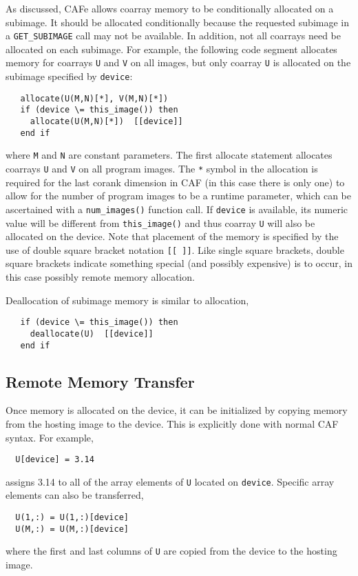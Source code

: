 As discussed, CAFe allows coarray memory to be conditionally allocated on a subimage.
It should be allocated conditionally because the requested subimage in a \texttt{GET\_SUBIMAGE}
call may not be available.  In addition, not all coarrays need be allocated on each
subimage.  For example, the following code segment allocates memory for coarrays
\texttt{U} and \texttt{V} on all images, but only coarray \texttt{U} is allocated on
the subimage specified by \texttt{device}:
\small
\begin{verbatim}
   allocate(U(M,N)[*], V(M,N)[*])
   if (device \= this_image()) then
     allocate(U(M,N)[*])  [[device]]
   end if
\end{verbatim}
\normalsize
where \texttt{M} and \texttt{N} are constant parameters.  The first allocate statement
allocates coarrays \texttt{U} and \texttt{V} on all program images.  The \texttt{*} symbol
in the allocation is required for the last corank dimension in CAF (in this case there is
only one) to allow for the number of program images to be a runtime parameter, which can
be ascertained with a \texttt{num\_images()} function call.  If \texttt{device} is
available, its numeric value will be different from \texttt{this\_image()} and thus
coarray \texttt{U} will also be allocated on the device.  Note that placement of the
memory is specified by the use of double square bracket notation \texttt{[[ ]]}.  Like
single square brackets, double square brackets indicate something special (and possibly
expensive) is to occur, in this case possibly remote memory allocation.

Deallocation of subimage memory is similar to allocation,
\small
\begin{verbatim}
   if (device \= this_image()) then
     deallocate(U)  [[device]]
   end if
\end{verbatim}
\normalsize


\subsection{Remote Memory Transfer}

Once memory is allocated on the device, it can be initialized by copying memory from the
hosting image to the device.  This is explicitly done with normal CAF syntax.  For example,
\small
\begin{verbatim}
  U[device] = 3.14
\end{verbatim}
\normalsize
assigns 3.14 to all of the array elements of \texttt{U} located on \texttt{device}.
Specific array elements can also be transferred, 
\small
\begin{verbatim}
  U(1,:) = U(1,:)[device]
  U(M,:) = U(M,:)[device]
\end{verbatim}
\normalsize
where the first and last columns of \texttt{U} are copied from the device to the hosting image.

